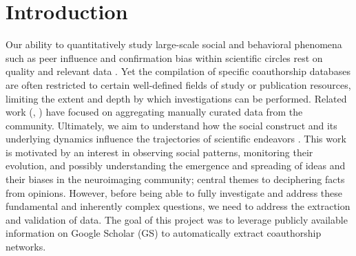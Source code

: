 \documentclass[twocolumn]{bmcart}%
\begin{document}
\begin{frontmatter}
\begin{fmbox}










%
\end{fmbox}%

\end{frontmatter}


\section{Introduction}\label{introduction}

Our ability to quantitatively study large-scale social and behavioral
phenomena such as peer influence and confirmation bias within scientific
circles rest on quality and relevant data
\cite{BiologicalNetworks:Freeman2004}. Yet the compilation of specific
coauthorship databases are often restricted to certain well-defined
fields of study or publication resources, limiting the extent and depth
by which investigations can be performed. Related work (\cite{OSF:Scinet}, \cite{PLOS:Neurotree})
have focused on aggregating
manually curated data from the community. Ultimately, we aim to
understand how the social construct and its underlying dynamics
influence the trajectories of scientific endeavors
\cite{Sarigol2014:PredictingSuccess}. This work is motivated by an
interest in observing social patterns, monitoring their evolution, and
possibly understanding the emergence and spreading of ideas and their
biases in the neuroimaging community; central themes to deciphering
facts from opinions. However, before being able to fully investigate and
address these fundamental and inherently complex questions, we need to
address the extraction and validation of data. The goal of this project
was to leverage publicly available information on Google Scholar (GS) to
automatically extract coauthorship networks.
\end{document}
